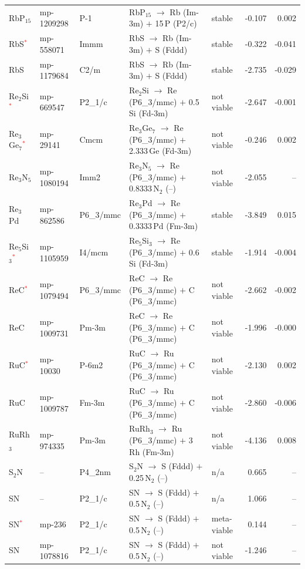 \begin{longtable}{@{}ll l@{\hspace{4pt}} p{4.6cm} l@{\hspace{4pt}} rr@{}}
RbP$_{15}$ & mp-1209298 & P-1 & RbP$_{15}$ $\to$ Rb (Im-3m) $+$ 15\,P (P2/c) & stable & -0.107 & 0.002 \\
RbS\textcolor{red}{$^*$} & mp-558071 & Immm & RbS $\to$ Rb (Im-3m) $+$ S (Fddd) & stable & -0.322 & -0.041 \\
RbS & mp-1179684 & C2/m & RbS $\to$ Rb (Im-3m) $+$ S (Fddd) & stable & -2.735 & -0.029 \\
Re$_{2}$Si\textcolor{red}{$^*$} & mp-669547 & P2\_1/c & Re$_{2}$Si $\to$ Re (P6\_3/mmc) $+$ 0.5\,Si (Fd-3m) & not viable & -2.647 & -0.001 \\
Re$_{3}$Ge$_{7}$\textcolor{red}{$^*$} & mp-29141 & Cmcm & Re$_{3}$Ge$_{7}$ $\to$ Re (P6\_3/mmc) $+$ 2.333\,Ge (Fd-3m) & not viable & -0.246 & 0.002 \\
Re$_{3}$N$_{5}$ & mp-1080194 & Imm2 & Re$_{3}$N$_{5}$ $\to$ Re (P6\_3/mmc) $+$ 0.8333\,N$_{2}$ (--) & not viable & -2.055 & -- \\
Re$_{3}$Pd & mp-862586 & P6\_3/mmc & Re$_{3}$Pd $\to$ Re (P6\_3/mmc) $+$ 0.3333\,Pd (Fm-3m) & stable & -3.849 & 0.015 \\
Re$_{5}$Si$_{3}$\textcolor{red}{$^*$} & mp-1105959 & I4/mcm & Re$_{5}$Si$_{3}$ $\to$ Re (P6\_3/mmc) $+$ 0.6\,Si (Fd-3m) & stable & -1.914 & -0.004 \\
ReC\textcolor{red}{$^*$} & mp-1079494 & P6\_3/mmc & ReC $\to$ Re (P6\_3/mmc) $+$ C (P6\_3/mmc) & not viable & -2.662 & -0.002 \\
ReC & mp-1009731 & Pm-3m & ReC $\to$ Re (P6\_3/mmc) $+$ C (P6\_3/mmc) & not viable & -1.996 & -0.000 \\
RuC\textcolor{red}{$^*$} & mp-10030 & P-6m2 & RuC $\to$ Ru (P6\_3/mmc) $+$ C (P6\_3/mmc) & not viable & -2.130 & 0.002 \\
RuC & mp-1009787 & Fm-3m & RuC $\to$ Ru (P6\_3/mmc) $+$ C (P6\_3/mmc) & not viable & -2.860 & -0.006 \\
RuRh$_{3}$ & mp-974335 & Pm-3m & RuRh$_{3}$ $\to$ Ru (P6\_3/mmc) $+$ 3\,Rh (Fm-3m) & not viable & -4.136 & 0.008 \\
S$_{2}$N & -- & P4\_2nm & S$_{2}$N $\to$ S (Fddd) $+$ 0.25\,N$_{2}$ (--) & n/a & 0.665 & -- \\
SN & -- & P2\_1/c & SN $\to$ S (Fddd) $+$ 0.5\,N$_{2}$ (--) & n/a & 1.066 & -- \\
SN\textcolor{red}{$^*$} & mp-236 & P2\_1/c & SN $\to$ S (Fddd) $+$ 0.5\,N$_{2}$ (--) & meta-viable & 0.144 & -- \\
SN & mp-1078816 & P2\_1/c & SN $\to$ S (Fddd) $+$ 0.5\,N$_{2}$ (--) & not viable & -1.246 & -- \\

\end{longtable}
